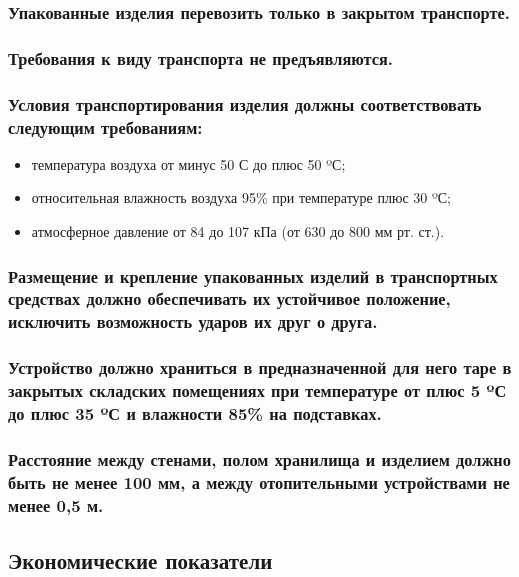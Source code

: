 \documentclass[a4paper]{bsuir-tor}
\begin{document}
\subsubsection{Упакованные изделия перевозить только в закрытом транспорте.}

\subsubsection{ Требования к виду транспорта не предъявляются.}

\subsubsection{Условия транспортирования изделия должны
  соответствовать следующим требованиям: }
\begin{itemize}
\item температура воздуха от минус 50 С до плюс 50 ºС;
\item относительная влажность воздуха 95\% при температуре плюс 30 ºС;
\item атмосферное давление от 84 до 107 кПа (от 630 до 800 мм рт. ст.).  
\end{itemize}


\subsubsection{Размещение и крепление упакованных изделий
  в транспортных средствах должно обеспечивать их устойчивое положение,
  исключить возможность ударов их друг о друга.}


\subsubsection{Устройство должно храниться в предназначенной для него таре
  в закрытых складских помещениях
  при температуре от плюс 5 ºС до плюс 35 ºС и влажности
  85\% на подставках.}

\subsubsection{Расстояние между стенами, полом хранилища
  и изделием должно быть не менее 100 мм, а между отопительными
  устройствами не менее 0,5 м.}

\subsection{Экономические показатели}
\end{document}
